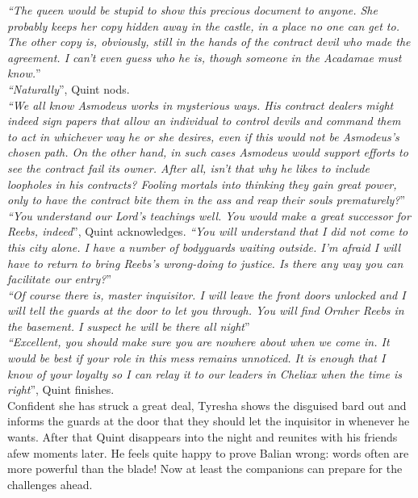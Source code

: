 {\itshape``The queen would be stupid to show this precious document to anyone. She probably keeps her copy hidden away in the castle, in a place no one can get to. The other copy is, obviously, still in the hands of the contract devil who made the agreement. I can't even guess who he is, though someone in the Acadamae must know.}''\\

{\itshape``Naturally}'', Quint nods.\\

{\itshape``We all know Asmodeus works in mysterious ways. His contract dealers might indeed sign papers that allow an individual to control devils and command them to act in whichever way he or she desires, even if this would not be Asmodeus's chosen path. On the other hand, in such cases Asmodeus would support efforts to see the contract fail its owner. After all, isn't that why he likes to include loopholes in his contracts? Fooling mortals into thinking they gain great power, only to have the contract bite them in the ass and reap their souls prematurely?}''\\

{\itshape``You understand our Lord's teachings well. You would make a great successor for Reebs, indeed}'', Quint acknowledges. {\itshape``You will understand that I did not come to this city alone. I have a number of bodyguards waiting outside. I'm afraid I will have to return to bring Reebs's wrong-doing to justice. Is there any way you can facilitate our entry?}''\\

{\itshape``Of course there is, master inquisitor. I will leave the front doors unlocked and I will tell the guards at the door to let you through. You will find Ornher Reebs in the basement. I suspect he will be there all night}''\\

{\itshape``Excellent, you should make sure you are nowhere about when we come in. It would be best if your role in this mess remains unnoticed. It is enough that I know of your loyalty so I can relay it to our leaders in Cheliax when the time is right}'', Quint finishes.\\

Confident she has struck a great deal, Tyresha shows the disguised bard out and informs the guards at the door that they should let the inquisitor in whenever he wants. After that Quint disappears into the night and reunites with his friends afew moments later. He feels quite happy to prove Balian wrong: words often are more powerful than the blade! Now at least the companions can prepare for the challenges ahead.\\

